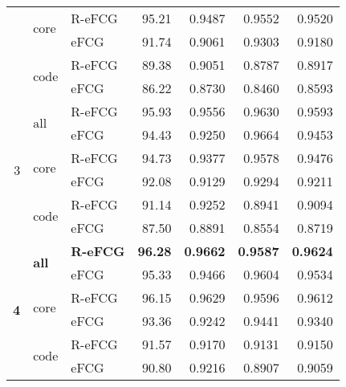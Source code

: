 \begin{table}[]
\begin{tabular}{@{}rllrrrr@{}}
                   & \multirow[t]{2}{*}{$\mathrm{core}$} & R-eFCG   & 95.21         & 0.9487    & 0.9552 & 0.9520   \\
                   &                                  & eFCG     & 91.74         & 0.9061    & 0.9303 & 0.9180   \\
                   & \multirow[t]{2}{*}{$\mathrm{code}$} & R-eFCG   & 89.38         & 0.9051    & 0.8787 & 0.8917   \\
                   &                                  & eFCG     & 86.22         & 0.8730    & 0.8460 & 0.8593   \\\midrule
\multirow[t]{6}{*}{3} & \multirow[t]{2}{*}{$\mathrm{all}$}  & R-eFCG   & 95.93         & 0.9556    & 0.9630 & 0.9593   \\
                   &                                  & eFCG     & 94.43         & 0.9250    & 0.9664 & 0.9453   \\
                   & \multirow[t]{2}{*}{$\mathrm{core}$} & R-eFCG   & 94.73         & 0.9377    & 0.9578 & 0.9476   \\
                   &                                  & eFCG     & 92.08         & 0.9129    & 0.9294 & 0.9211   \\
                   & \multirow[t]{2}{*}{$\mathrm{code}$} & R-eFCG   & 91.14         & 0.9252    & 0.8941 & 0.9094   \\
                   &                                  & eFCG     & 87.50         & 0.8891    & 0.8554 & 0.8719   \\\midrule
\multirow[t]{6}{*}{\textbf{4}} & \multirow[t]{2}{*}{$\mathbf{all}$}  & \textbf{R-eFCG}   & \textbf{96.28}         & \textbf{0.9662}    & \textbf{0.9587} & \textbf{0.9624}   \\
                   &                                  & eFCG     & 95.33         & 0.9466    & 0.9604 & 0.9534   \\
                   & \multirow[t]{2}{*}{$\mathrm{core}$} & R-eFCG   & 96.15         & 0.9629    & 0.9596 & 0.9612   \\
                   &                                  & eFCG     & 93.36         & 0.9242    & 0.9441 & 0.9340   \\
                   & \multirow[t]{2}{*}{$\mathrm{code}$} & R-eFCG   & 91.57         & 0.9170    & 0.9131 & 0.9150   \\
                   &                                  & eFCG     & 90.80         & 0.9216    & 0.8907 & 0.9059   \\ \bottomrule 
\end{tabular}
\end{table}
